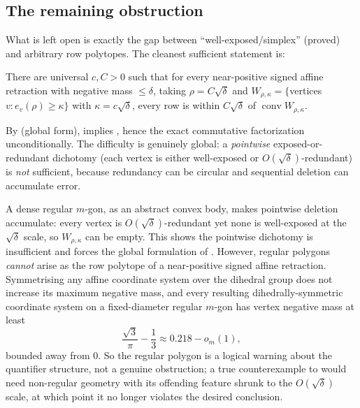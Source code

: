 \subsection{The remaining obstruction}

What is left open is exactly the gap between ``well-exposed/simplex'' (proved)
and arbitrary row polytopes. The cleanest sufficient statement is:

\begin{openproblem}\label{op:exposed-hull}
There are universal $c,C>0$ such that for every near-positive signed affine
retraction with negative mass $\le\delta$, taking $\rho=C\sqrt\delta$ and
$W_{\rho,\kappa}=\{$vertices $v:e_v(\rho)\ge\kappa\}$ with
$\kappa=c\sqrt\delta$, every row is within $C\sqrt\delta$ of
$\operatorname{conv}W_{\rho,\kappa}$.
\end{openproblem}

By  (global form), 
implies , hence the exact commutative factorization
unconditionally. The difficulty is genuinely global: a \emph{pointwise}
exposed-or-redundant dichotomy (each vertex is either well-exposed or
$O(\sqrt\delta)$-redundant) is \emph{not} sufficient, because redundancy can be
circular and sequential deletion can accumulate error.

\begin{remark}
\label{rem:regular-polygon}
A dense regular $m$-gon, as an abstract convex body, makes pointwise deletion
accumulate: every vertex is $O(\sqrt\delta)$-redundant yet none is well-exposed
at the $\sqrt\delta$ scale, so $W_{\rho,\kappa}$ can be empty. This shows the
pointwise dichotomy is insufficient and forces the global formulation of
. However, regular polygons \emph{cannot} arise as the row
polytope of a near-positive signed affine retraction. Symmetrising any affine
coordinate system over the dihedral group does not increase its maximum negative
mass, and every resulting dihedrally-symmetric coordinate system on a
fixed-diameter regular $m$-gon has vertex negative mass at least
\[
  \frac{\sqrt3}{\pi}-\frac13\approx0.218-o_m(1),
\]
bounded away from $0$. So the regular polygon is a logical warning about the
quantifier structure, not a genuine obstruction; a true counterexample to
 would need non-regular geometry with its offending
feature shrunk to the $O(\sqrt\delta)$ scale, at which point it no longer
violates the desired conclusion.
\end{remark}

